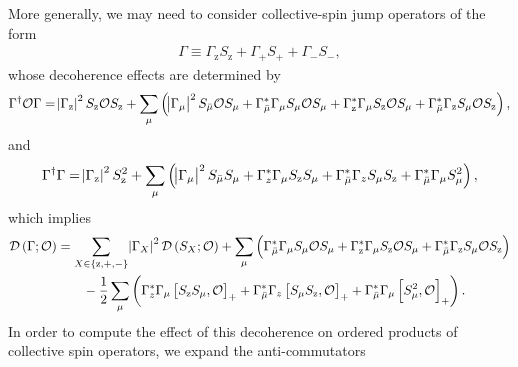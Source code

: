 \documentclass[aps,notitlepage,nofootinbib,11pt]{revtex4-1}
\newcommand{\f}[2]{\dfrac{#1}{#2}} %
\newcommand{\p}[1]{\left(#1\right)} %
\renewcommand{\sp}[1]{\left[#1\right]} %
\renewcommand{\set}[1]{\left\{#1\right\}} %
\newcommand{\D}{\mathcal{D}}
\renewcommand{\O}{\mathcal{O}}
\newcommand{\z}{\text{z}}
\newcommand{\bmu}{{\bar\mu}}
\newcommand{\1}{\mathds{1}}
\begin{document}
More generally, we may need to consider collective-spin jump operators
of the form
\begin{align}
  \Gamma \equiv \Gamma_\z S_\z + \Gamma_+ S_+ + \Gamma_- S_-,
\end{align}
whose decoherence effects are determined by
\begin{align}
  \Gamma^\dag \O \Gamma
  = \abs{\Gamma_\z}^2 S_\z \O S_\z
  + \sum_\mu \p{\abs{\Gamma_\mu}^2 S_\bmu \O S_\mu
    + \Gamma_\bmu^* \Gamma_\mu S_\mu \O S_\mu
    + \Gamma_\z^* \Gamma_\mu S_\z \O S_\mu
    + \Gamma_\bmu^* \Gamma_\z S_\mu \O S_\z},
\end{align}
and
\begin{align}
  \Gamma^\dag \Gamma
  = \abs{\Gamma_\z}^2 S_\z^2
  + \sum_\mu \p{\abs{\Gamma_\mu}^2 S_\bmu S_\mu
    + \Gamma_z^*\Gamma_\mu S_\z S_\mu
    + \Gamma_\bmu^* \Gamma_z S_\mu S_\z
    + \Gamma_\bmu^* \Gamma_\mu S_\mu^2},
\end{align}
which implies
\begin{align}
  \D\p{\Gamma;\O}
  &= \sum_{X\in\set{\z,+,-}} \abs{\Gamma_X}^2 \D\p{S_X;\O}
  + \sum_\mu \p{\Gamma_\bmu^* \Gamma_\mu S_\mu \O S_\mu
    + \Gamma_\z^* \Gamma_\mu S_\z \O S_\mu
    + \Gamma_\bmu^* \Gamma_\z S_\mu \O S_\z}
  \notag \\
  &\qquad -\f12 \sum_\mu\p{\Gamma_z^*\Gamma_\mu \sp{S_\z S_\mu, \O}_+
    + \Gamma_\bmu^* \Gamma_z \sp{S_\mu S_\z, \O}_+
    + \Gamma_\bmu^* \Gamma_\mu \sp{S_\mu^2, \O}_+}.
  \label{eq:D_general_collective}
\end{align}
In order to compute the effect of this decoherence on ordered products
of collective spin operators, we expand the anti-commutators
\end{document}
